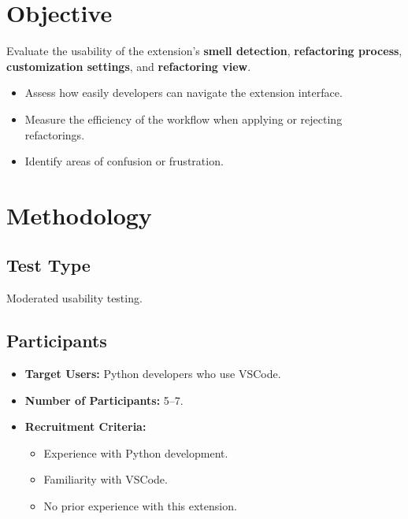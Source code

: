\documentclass[12pt, titlepage]{article}
\begin{document}
\section*{Objective}
Evaluate the usability of the extension's \textbf{smell detection},
\textbf{refactoring process}, \textbf{customization settings}, and
\textbf{refactoring view}.

\begin{itemize}
  \item Assess how easily developers can navigate the extension interface.
  \item Measure the efficiency of the workflow when applying or
    rejecting refactorings.
  \item Identify areas of confusion or frustration.
\end{itemize}

\section*{Methodology}
\subsection*{Test Type}
Moderated usability testing.

\subsection*{Participants}
\begin{itemize}
  \item \textbf{Target Users:} Python developers who use VSCode.
  \item \textbf{Number of Participants:} 5–7.
  \item \textbf{Recruitment Criteria:}
    \begin{itemize}
      \item Experience with Python development.
      \item Familiarity with VSCode.
      \item No prior experience with this extension.
    \end{itemize}
\end{itemize}
\end{document}
